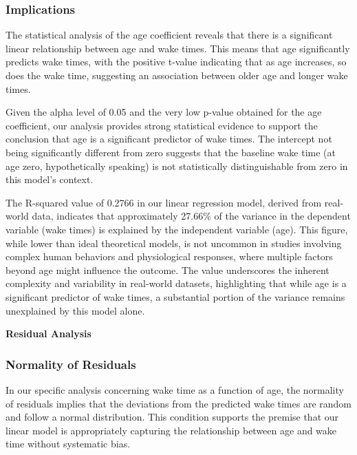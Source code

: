 \documentclass[
]{article}
\begin{document}
\hypertarget{implications-1}{%
\subsubsection{Implications}\label{implications-1}}

The statistical analysis of the age coefficient reveals that there is a
significant linear relationship between age and wake times. This means
that age significantly predicts wake times, with the positive t-value
indicating that as age increases, so does the wake time, suggesting an
association between older age and longer wake times.

Given the alpha level of 0.05 and the very low p-value obtained for the
age coefficient, our analysis provides strong statistical evidence to
support the conclusion that age is a significant predictor of wake
times. The intercept not being significantly different from zero
suggests that the baseline wake time (at age zero, hypothetically
speaking) is not statistically distinguishable from zero in this model's
context.

The R-squared value of 0.2766 in our linear regression model, derived
from real-world data, indicates that approximately 27.66\% of the
variance in the dependent variable (wake times) is explained by the
independent variable (age). This figure, while lower than ideal
theoretical models, is not uncommon in studies involving complex human
behaviors and physiological responses, where multiple factors beyond age
might influence the outcome. The value underscores the inherent
complexity and variability in real-world datasets, highlighting that
while age is a significant predictor of wake times, a substantial
portion of the variance remains unexplained by this model alone.

\textbf{Residual Analysis}

\hypertarget{normality-of-residuals-1}{%
\subsubsection{Normality of Residuals}\label{normality-of-residuals-1}}

In our specific analysis concerning wake time as a function of age, the
normality of residuals implies that the deviations from the predicted
wake times are random and follow a normal distribution. This condition
supports the premise that our linear model is appropriately capturing
the relationship between age and wake time without systematic bias.
\end{document}
